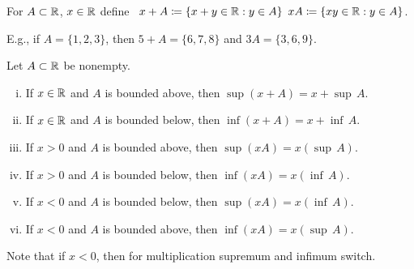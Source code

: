 \documentclass[10pt,aspectratio=149]{beamer}
\begin{document}
\begin{frame}
For $A \subset {\mathbb{R}}$, $x \in {\mathbb{R}}$ define
~$x + A  \coloneqq \{ x+y \in {\mathbb{R}} : y \in A \}$ \quad
$xA  \coloneqq \{ xy \in {\mathbb{R}} : y \in A \}$.

\medskip
\pause

E.g., if $A = \{ 1,2,3 \}$, then $5+A = \{ 6,7,8 \}$ and $3A = \{ 3,6,9
\}$.

\pause

\begin{proposition}
Let $A \subset {\mathbb{R}}$ be nonempty.
\begin{enumerate}[(i)]
\item If $x \in {\mathbb{R}}$ and $A$ is bounded above, then $\sup (x+A) = x + \sup\, A$.
\item \pause If $x \in {\mathbb{R}}$ and $A$ is bounded below, then $\inf (x+A) = x + \inf\, A$.
\item \pause If $x > 0$ and $A$ is bounded above, then $\sup (xA) = x ( \sup\, A )$.
\item \pause If $x > 0$ and $A$ is bounded below, then $\inf (xA) = x ( \inf\, A )$.
\item \pause If $x < 0$ and $A$ is bounded below, then $\sup (xA) = x ( \inf\, A )$.
\item \pause If $x < 0$ and $A$ is bounded above, then $\inf (xA) = x ( \sup\, A )$.
\end{enumerate}
\end{proposition}

\pause

Note that if $x < 0$, then for multiplication supremum and infimum switch.

\end{frame}
\end{document}
